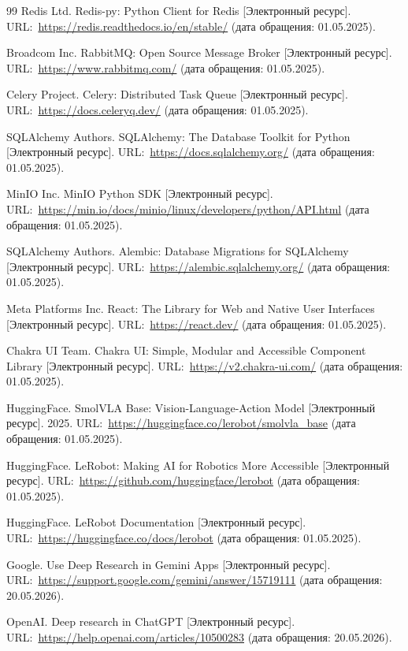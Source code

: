 \documentclass[14pt,a4paper]{extreport}
\begin{document}
\begin{thebibliography}{99}
Redis Ltd. Redis-py: Python Client for Redis [Электронный ресурс]. URL:~\url{https://redis.readthedocs.io/en/stable/} (дата обращения: 01.05.2025).

Broadcom Inc. RabbitMQ: Open Source Message Broker [Электронный ресурс]. URL:~\url{https://www.rabbitmq.com/} (дата обращения: 01.05.2025).

Celery Project. Celery: Distributed Task Queue [Электронный ресурс]. URL:~\url{https://docs.celeryq.dev/} (дата обращения: 01.05.2025).

SQLAlchemy Authors. SQLAlchemy: The Database Toolkit for Python [Электронный ресурс]. URL:~\url{https://docs.sqlalchemy.org/} (дата обращения: 01.05.2025).

MinIO Inc. MinIO Python SDK [Электронный ресурс]. URL:~\url{https://min.io/docs/minio/linux/developers/python/API.html} (дата обращения: 01.05.2025).

SQLAlchemy Authors. Alembic: Database Migrations for SQLAlchemy [Электронный ресурс]. URL:~\url{https://alembic.sqlalchemy.org/} (дата обращения: 01.05.2025).

Meta Platforms Inc. React: The Library for Web and Native User Interfaces [Электронный ресурс]. URL:~\url{https://react.dev/} (дата обращения: 01.05.2025).

Chakra UI Team. Chakra UI: Simple, Modular and Accessible Component Library [Электронный ресурс]. URL:~\url{https://v2.chakra-ui.com/} (дата обращения: 01.05.2025).

HuggingFace. SmolVLA Base: Vision-Language-Action Model [Электронный ресурс]. 2025. URL:~\url{https://huggingface.co/lerobot/smolvla_base} (дата обращения: 01.05.2025).

HuggingFace. LeRobot: Making AI for Robotics More Accessible [Электронный ресурс]. URL:~\url{https://github.com/huggingface/lerobot} (дата обращения: 01.05.2025).

HuggingFace. LeRobot Documentation [Электронный ресурс]. URL:~\url{https://huggingface.co/docs/lerobot} (дата обращения: 01.05.2025).

Google. Use Deep Research in Gemini Apps [Электронный ресурс]. URL:~\url{https://support.google.com/gemini/answer/15719111} (дата обращения: 20.05.2026).

OpenAI. Deep research in ChatGPT [Электронный ресурс]. URL:~\url{https://help.openai.com/articles/10500283} (дата обращения: 20.05.2026).

\end{thebibliography}
\end{document}
